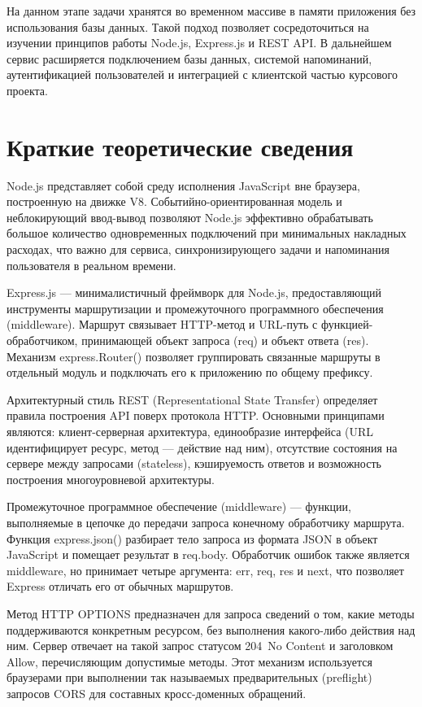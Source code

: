 \documentclass{stp}
\begin{document}
На данном этапе задачи хранятся во временном массиве в памяти
приложения без использования базы данных. Такой подход позволяет
сосредоточиться на изучении принципов работы Node.js, Express.js и
REST API. В дальнейшем сервис расширяется подключением базы данных,
системой напоминаний, аутентификацией пользователей и интеграцией с
клиентской частью курсового проекта.

\section{Краткие теоретические сведения}

Node.js представляет собой среду исполнения JavaScript вне браузера,
построенную на движке V8. Событийно-ориентированная модель и
неблокирующий ввод-вывод позволяют Node.js эффективно обрабатывать
большое количество одновременных подключений при минимальных
накладных расходах, что важно для сервиса, синхронизирующего задачи и
напоминания пользователя в реальном времени.

Express.js — минималистичный фреймворк для Node.js, предоставляющий
инструменты маршрутизации и промежуточного программного обеспечения
(middleware). Маршрут связывает HTTP-метод и URL-путь с
функцией-обработчиком, принимающей объект запроса (req) и
объект ответа (res). Механизм express.Router()
позволяет группировать связанные маршруты в отдельный модуль и
подключать его к приложению по общему префиксу.

Архитектурный стиль REST (Representational State Transfer) определяет
правила построения API поверх протокола HTTP. Основными принципами
являются: клиент-серверная архитектура, единообразие интерфейса (URL
идентифицирует ресурс, метод — действие над ним), отсутствие
состояния на сервере между запросами (stateless), кэшируемость
ответов и возможность построения многоуровневой архитектуры.

Промежуточное программное обеспечение (middleware) — функции,
выполняемые в цепочке до передачи запроса конечному обработчику
маршрута. Функция express.json() разбирает тело запроса из
формата JSON в объект JavaScript и помещает результат в
req.body. Обработчик ошибок также является middleware, но
принимает четыре аргумента: err, req, res
и next, что позволяет Express отличать его от обычных
маршрутов.

Метод HTTP OPTIONS предназначен для запроса сведений о том, какие
методы поддерживаются конкретным ресурсом, без выполнения какого-либо
действия над ним. Сервер отвечает на такой запрос статусом 204~No
Content и заголовком Allow, перечисляющим допустимые методы.
Этот механизм используется браузерами при выполнении так называемых
предварительных (preflight) запросов CORS для составных
кросс-доменных обращений.
\end{document}
